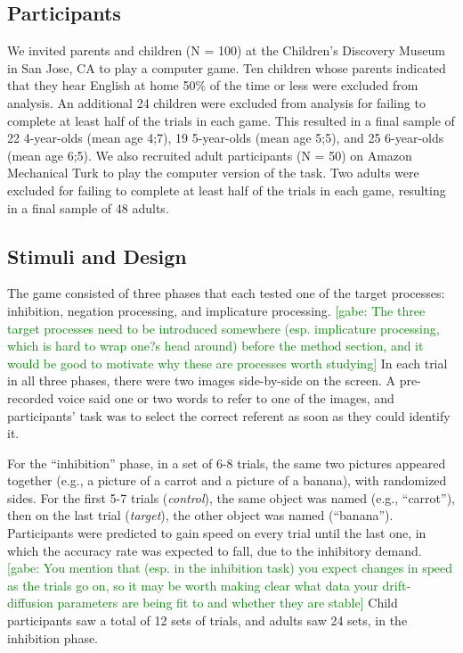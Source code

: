 \documentclass[10pt,letterpaper]{article}
\newcommand{\gabe}[1]{\textcolor{Green}{[gabe: #1]}}
\begin{document}
\subsection{Participants}

We invited parents and children (N = 100) at the Children's Discovery Museum in San Jose, CA to play a computer game.  Ten children whose parents indicated that they hear English at home 50\% of the time or less were excluded from analysis.  An additional 24 children were excluded from analysis for failing to complete at least half of the trials in each game.  This resulted in a final sample of 22 4-year-olds (mean age 4;7), 19 5-year-olds (mean age 5;5), and 25 6-year-olds (mean age 6;5).  We also recruited adult participants (N = 50) on Amazon Mechanical Turk to play the computer version of the task.  Two adults were excluded for failing to complete at least half of the trials in each game, resulting in a final sample of 48 adults.  

\subsection{Stimuli and Design}

The game consisted of three phases that each tested one of the target processes: inhibition, negation processing, and implicature processing. \gabe{The three target processes need to be introduced somewhere (esp. implicature processing, which is hard to wrap one?s head around) before the method section, and it would be good to motivate why these are processes worth studying} In each trial in all three phases, there were two images side-by-side on the screen. A pre-recorded voice said one or two words to refer to one of the images, and participants' task was to select the correct referent as soon as they could identify it.

For the ``inhibition'' phase, in a set of 6-8 trials, the same two pictures appeared together (e.g., a picture of a carrot and a picture of a banana), with randomized sides. For the first 5-7 trials (\emph{control}), the same object was named (e.g., ``carrot''), then on the last trial  (\emph{target}), the other object was named (``banana''). Participants were predicted to gain speed on every trial until the last one, in which the accuracy rate was expected to fall, due to the inhibitory demand. \gabe{You mention that (esp. in the inhibition task) you expect changes in speed as the trials go on, so it may be worth making clear what data your drift-diffusion parameters are being fit to and whether they are stable} Child participants saw a total of 12 sets of trials, and adults saw 24 sets, in the inhibition phase.
\end{document}
